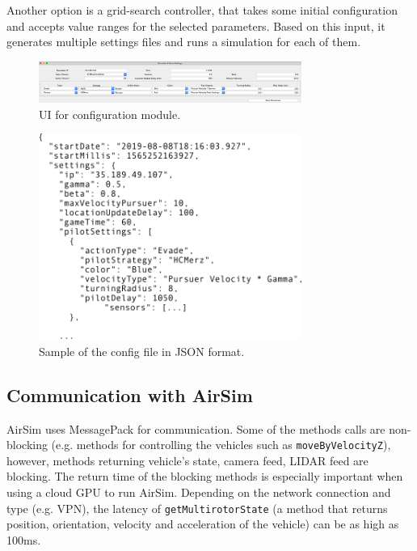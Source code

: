 \documentclass{article}
\begin{document}
Another option is a grid-search controller, that takes some initial configuration and accepts value ranges for the selected parameters. Based on this input, it generates multiple settings files and runs a simulation for each of them.

\begin{figure}
	\centering
	\includegraphics[width=8.6cm]{config-module}
	\caption{UI for configuration module.}\label{fig:config-module}
\end{figure}

\begin{figure}
	\centering
	\includegraphics[width=8.6cm]{settings}
	\caption{Sample of the config file in JSON format.}\label{fig:settings-format}
\end{figure}


\subsection{Communication with AirSim}

AirSim uses MessagePack \cite{messagepack} for communication. Some of the methods calls are non-blocking (e.g. methods for controlling the vehicles such as \verb|moveByVelocityZ|), however, methods returning vehicle's state, camera feed, LIDAR feed are blocking. The return time of the blocking methods is especially important when using a cloud GPU to run AirSim. Depending on the network connection and type (e.g. VPN), the latency of \verb|getMultirotorState| (a method that returns position, orientation, velocity and acceleration of the vehicle) can be as high as 100ms.
\end{document}
